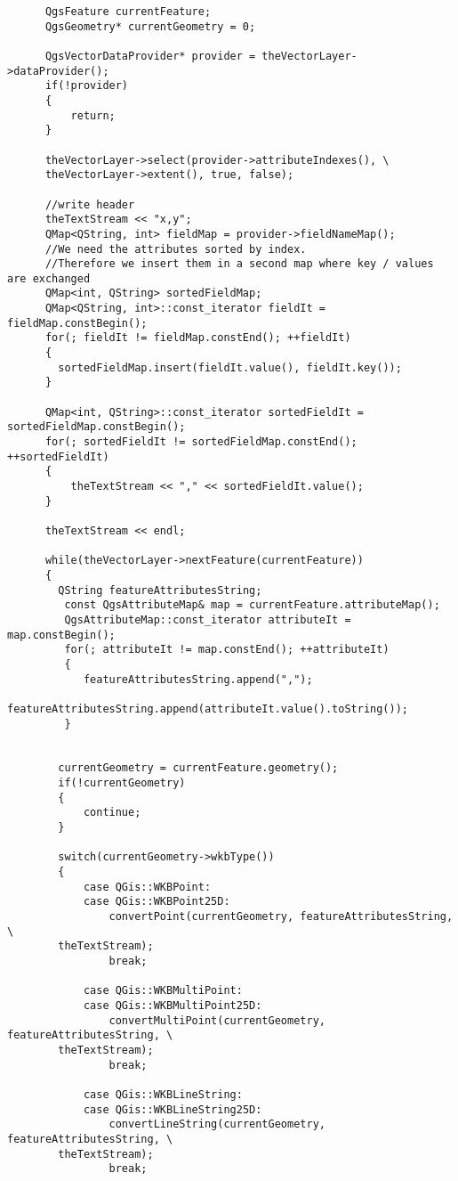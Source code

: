 \begin{verbatim}
      QgsFeature currentFeature;
      QgsGeometry* currentGeometry = 0;

      QgsVectorDataProvider* provider = theVectorLayer->dataProvider();
      if(!provider)
      {
          return;
      }

      theVectorLayer->select(provider->attributeIndexes(), \
      theVectorLayer->extent(), true, false);

      //write header
      theTextStream << "x,y";
      QMap<QString, int> fieldMap = provider->fieldNameMap();
      //We need the attributes sorted by index.
      //Therefore we insert them in a second map where key / values are exchanged
      QMap<int, QString> sortedFieldMap;
      QMap<QString, int>::const_iterator fieldIt = fieldMap.constBegin();
      for(; fieldIt != fieldMap.constEnd(); ++fieldIt)
      {
        sortedFieldMap.insert(fieldIt.value(), fieldIt.key());
      }

      QMap<int, QString>::const_iterator sortedFieldIt = sortedFieldMap.constBegin();
      for(; sortedFieldIt != sortedFieldMap.constEnd(); ++sortedFieldIt)
      {
          theTextStream << "," << sortedFieldIt.value();
      }

      theTextStream << endl;

      while(theVectorLayer->nextFeature(currentFeature))
      {
        QString featureAttributesString;
         const QgsAttributeMap& map = currentFeature.attributeMap();
         QgsAttributeMap::const_iterator attributeIt = map.constBegin();
         for(; attributeIt != map.constEnd(); ++attributeIt)
         {
            featureAttributesString.append(",");
            featureAttributesString.append(attributeIt.value().toString());
         }


        currentGeometry = currentFeature.geometry();
        if(!currentGeometry)
        {
            continue;
        }

        switch(currentGeometry->wkbType())
        {
            case QGis::WKBPoint:
            case QGis::WKBPoint25D:
                convertPoint(currentGeometry, featureAttributesString, \
		theTextStream);
                break;

            case QGis::WKBMultiPoint:
            case QGis::WKBMultiPoint25D:
                convertMultiPoint(currentGeometry, featureAttributesString, \
		theTextStream);
                break;

            case QGis::WKBLineString:
            case QGis::WKBLineString25D:
                convertLineString(currentGeometry, featureAttributesString, \
		theTextStream);
                break;


\end{verbatim}
